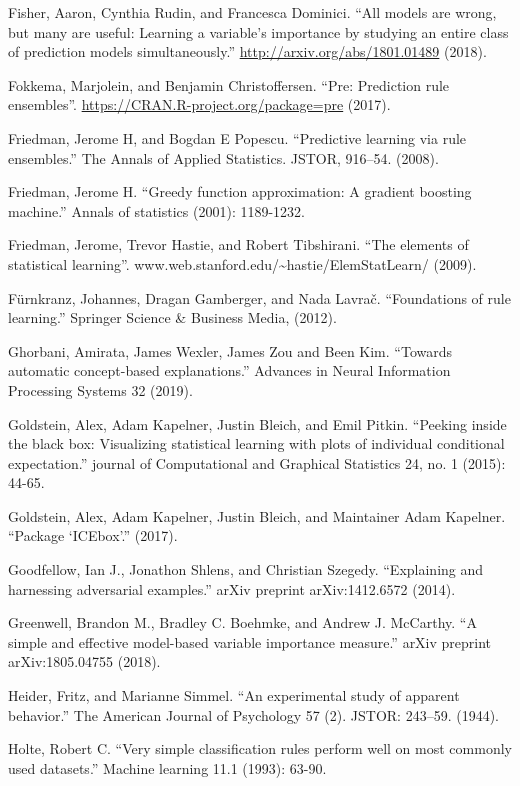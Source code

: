 \documentclass[
  11pt,
]{scrbook}
\begin{document}
Fisher, Aaron, Cynthia Rudin, and Francesca Dominici. ``All models are wrong, but many are useful: Learning a variable's importance by studying an entire class of prediction models simultaneously.'' \url{http://arxiv.org/abs/1801.01489} (2018).

Fokkema, Marjolein, and Benjamin Christoffersen. ``Pre: Prediction rule ensembles''. \url{https://CRAN.R-project.org/package=pre} (2017).

Friedman, Jerome H, and Bogdan E Popescu. ``Predictive learning via rule ensembles.'' The Annals of Applied Statistics. JSTOR, 916--54. (2008).

Friedman, Jerome H. ``Greedy function approximation: A gradient boosting machine.'' Annals of statistics (2001): 1189-1232.

Friedman, Jerome, Trevor Hastie, and Robert Tibshirani. ``The elements of statistical learning''. www.web.stanford.edu/\textasciitilde hastie/ElemStatLearn/ (2009).

Fürnkranz, Johannes, Dragan Gamberger, and Nada Lavrač. ``Foundations of rule learning.'' Springer Science \& Business Media, (2012).

Ghorbani, Amirata, James Wexler, James Zou and Been Kim. ``Towards automatic concept-based explanations.'' Advances in Neural Information Processing Systems 32 (2019).

Goldstein, Alex, Adam Kapelner, Justin Bleich, and Emil Pitkin. ``Peeking inside the black box: Visualizing statistical learning with plots of individual conditional expectation.'' journal of Computational and Graphical Statistics 24, no. 1 (2015): 44-65.

Goldstein, Alex, Adam Kapelner, Justin Bleich, and Maintainer Adam Kapelner. ``Package `ICEbox'.'' (2017).

Goodfellow, Ian J., Jonathon Shlens, and Christian Szegedy. ``Explaining and harnessing adversarial examples.'' arXiv preprint arXiv:1412.6572 (2014).

Greenwell, Brandon M., Bradley C. Boehmke, and Andrew J. McCarthy. ``A simple and effective model-based variable importance measure.'' arXiv preprint arXiv:1805.04755 (2018).

Heider, Fritz, and Marianne Simmel. ``An experimental study of apparent behavior.'' The American Journal of Psychology 57 (2). JSTOR: 243--59. (1944).

Holte, Robert C. ``Very simple classification rules perform well on most commonly used datasets.'' Machine learning 11.1 (1993): 63-90.
\end{document}
